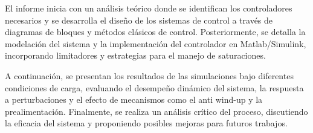 El informe inicia con un análisis teórico donde se identifican los controladores necesarios y se desarrolla el diseño de los 
sistemas de control a través de diagramas de bloques y métodos clásicos de control. Posteriormente, se detalla la 
modelación del sistema y la implementación del controlador en Matlab/Simulink, incorporando limitadores y estrategias para el manejo 
de saturaciones.

A continuación, se presentan los resultados de las simulaciones bajo diferentes condiciones de carga, evaluando el desempeño dinámico 
del sistema, la respuesta a perturbaciones y el efecto de mecanismos como el anti wind-up y la 
prealimentación. Finalmente, se realiza un análisis crítico del proceso, discutiendo la eficacia del sistema y proponiendo posibles 
mejoras para futuros trabajos.
